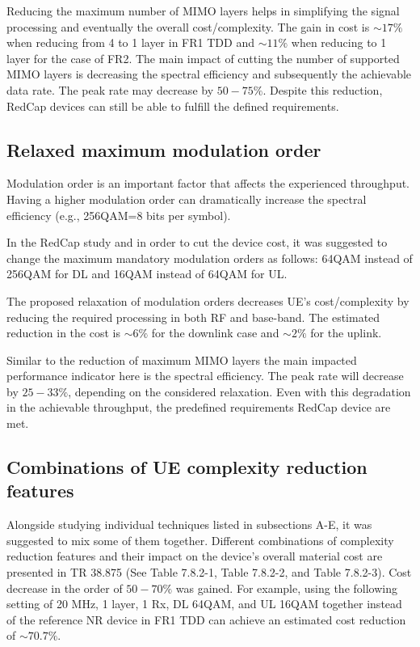 \documentclass[]{IEEEtran}
\begin{document}
Reducing the maximum number of MIMO layers helps in simplifying the signal processing and eventually the overall cost/complexity. The gain in cost is $\sim17\%$ when reducing from 4 to 1 layer in FR1 TDD and $\sim11\%$ when reducing to 1 layer for the case of FR2.
The main impact of cutting the number of supported MIMO layers is decreasing the spectral efficiency and subsequently the achievable data rate. The peak rate may decrease by $50-75\%$. Despite this reduction, RedCap devices can still be able to fulfill the defined requirements.

\subsection{Relaxed maximum modulation order}
\label{sec:4-5}

Modulation order is an important factor that affects the experienced throughput. Having a higher modulation order can dramatically increase the spectral efficiency (e.g., 256QAM=8 bits per symbol).

In the RedCap study and in order to cut the device cost, it was suggested to change the maximum mandatory modulation orders as follows: 64QAM instead of 256QAM for DL  and 16QAM instead of 64QAM for UL.

The proposed relaxation of modulation orders decreases UE's cost/complexity by reducing the required processing in both RF and base-band. The estimated reduction in the cost is $\sim6\%$ for the downlink case and $\sim2\%$ for the uplink.

Similar to the reduction of maximum MIMO layers the main impacted performance indicator here is the spectral efficiency. The peak rate will decrease by $25-33\%$, depending on the considered relaxation. Even with this degradation in the achievable throughput, the predefined requirements RedCap device are met.  

\subsection{Combinations of UE complexity reduction features}
\label{sec:4-6}
Alongside studying individual techniques listed in subsections A-E, it was suggested to mix some of them together. Different combinations of complexity reduction features and their impact on the device's overall material cost are presented in TR 38.875 (See Table 7.8.2-1, Table 7.8.2-2, and Table 7.8.2-3). Cost decrease in the order of $50-70\%$ was gained. For example, using the following setting of 20 MHz, 1 layer, 1 Rx, DL 64QAM, and UL 16QAM together instead of the reference NR device in FR1 TDD can achieve an estimated cost reduction of $\sim70.7\%$.
\end{document}
